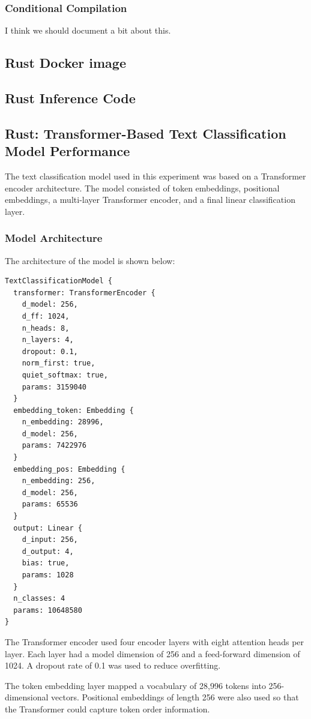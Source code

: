 \documentclass{ieeeaccess}
\begin{document}
\subsubsection{Conditional Compilation}
I think we should document a bit about this. 

\subsection{Rust Docker image}

\subsection{Rust Inference Code}

\subsection{Rust: Transformer-Based Text Classification Model Performance}

The text classification model used in this experiment was based on a Transformer encoder architecture. The model consisted of token embeddings, positional embeddings, a multi-layer Transformer encoder, and a final linear classification layer.

\subsubsection{Model Architecture}

The architecture of the model is shown below:

\begin{lstlisting}
TextClassificationModel {
  transformer: TransformerEncoder {
    d_model: 256,
    d_ff: 1024,
    n_heads: 8,
    n_layers: 4,
    dropout: 0.1,
    norm_first: true,
    quiet_softmax: true,
    params: 3159040
  }
  embedding_token: Embedding {
    n_embedding: 28996,
    d_model: 256,
    params: 7422976
  }
  embedding_pos: Embedding {
    n_embedding: 256,
    d_model: 256,
    params: 65536
  }
  output: Linear {
    d_input: 256,
    d_output: 4,
    bias: true,
    params: 1028
  }
  n_classes: 4
  params: 10648580
}
\end{lstlisting}

The Transformer encoder used four encoder layers with eight attention heads per layer. Each layer had a model dimension of 256 and a feed-forward dimension of 1024. A dropout rate of 0.1 was used to reduce overfitting.

The token embedding layer mapped a vocabulary of 28,996 tokens into 256-dimensional vectors. Positional embeddings of length 256 were also used so that the Transformer could capture token order information.
\end{document}
